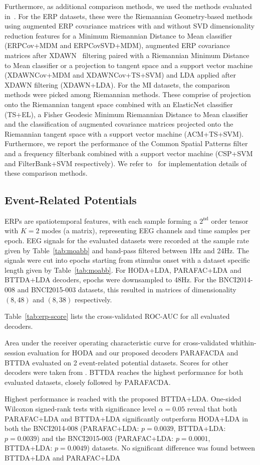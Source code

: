 \documentclass[twocolumn]{article}
\begin{document}
Furthermore, as additional comparison methods, we used the methods evaluated in~\cite{Chevallier2024}.
For the ERP datasets, these were the Riemannian Geometry-based methods
using augmented ERP covariance matrices with and without SVD dimensionality
reduction features for a Minimum Riemannian Distance to Mean classifier
(ERPCov+MDM and ERPCovSVD+MDM), augmented ERP covariance matrices after
XDAWN~\cite{Rivet2009}
filtering paired with a Riemannian Minimum Distance to Mean classifier or a
projection to tangent space and a support vector machine (XDAWNCov+MDM and
XDAWNCov+TS+SVM) and LDA applied after XDAWN filtering (XDAWN+LDA).
For the MI datasets, the comparison methods were picked among Riemannian
methods.
These comprise of projection onto the Riemannian tangent space combined with an
ElasticNet classifier (TS+EL), a Fisher Geodesic Minimum Riemannian Distance to
Mean classifier and the classification of augmented covariance matrices
projected onto the Riemannian tangent space with a support vector machine
(ACM+TS+SVM).
Furthermore, we report the performance of the Common Spatial Patterns filter
and a frequency filterbank combined with a support vector machine (CSP+SVM and
FilterBank+SVM respectively).
We refer to~\cite{Chevallier2024} for implementation details of these comparison
methods.

\subsection{Event-Related Potentials}
ERPs are spatiotemporal features, with each sample forming a $2^\text{nd}$
order tensor with $K=2$ modes (a matrix), representing EEG channels and time samples
per epoch.
EEG signals for the evaluated datasets were recorded at the sample rate given
by Table~\ref{tab:moabb} and band-pass filtered between 1Hz
and 24Hz.
The signals were cut into epochs starting from stimulus onset with a
dataset specific length given by Table~\ref{tab:moabb}.
For HODA+LDA, PARAFAC+LDA and BTTDA+LDA decoders, epochs were downsampled to 48Hz.
For the BNCI2014-008 and BNCI2015-003 datasets, this resulted in matrices of
dimensionality $(8,48)$ and $(8,38)$ respectively.

Table~\ref{tab:erp-score} lists the cross-validated ROC-AUC for all evaluated
decoders.
\begin{table}[t]
	\footnotesize
	\centering
	
	\caption{Area under the receiver operating characteristic curve for
		cross-validated whithin-session evaluation for HODA and our proposed decoders
		PARAFACDA and BTTDA evaluated on 2 event-related potential datasets.
		Scores for other decoders were taken from \cite{Chevallier2024}.
		BTTDA reaches the highest performance for both evaluated datasets, closely
		followed by PARAFACDA.
	}
	\label{tab:erp-score}
\end{table}
Highest performance is reached with the proposed BTTDA+LDA.
One-sided Wilcoxon signed-rank tests with significance level $\alpha=0.05$ reveal that both PARAFAC+LDA and BTTDA+LDA
significantly outperform HODA+LDA in both the BNCI2014-008 (PARAFAC+LDA:
$p=0.0039$, BTTDA+LDA: $p=0.0039$) and the BNCI2015-003 (PARAFAC+LDA:
$p=0.0001$, BTTDA+LDA: $p=0.0049$) datasets.
No significant difference was found between BTTDA+LDA and PARAFAC+LDA
\end{document}
